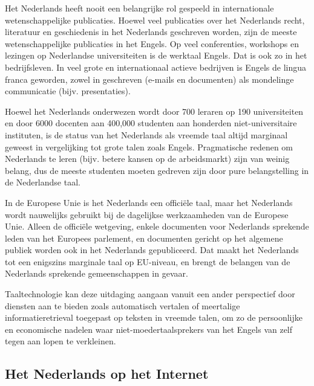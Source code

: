 \documentclass[]{../../metanetpaper}
\begin{document}
\begin{multicols}{2}
    Het Nederlands heeft nooit een belangrijke rol gespeeld in internationale wetenschappelijke publicaties. Hoewel veel publicaties over het Nederlands recht, literatuur en geschiedenis in het Nederlands geschreven worden, zijn de meeste wetenschappelijke publicaties in het Engels. Op veel conferenties, workshops en lezingen op Nederlandse universiteiten is de werktaal Engels. Dat is ook zo in het bedrijfsleven. In veel grote en internationaal actieve bedrijven is Engels de lingua franca geworden, zowel in geschreven (e-mails en documenten) als mondelinge communicatie (bijv. presentaties).


    Hoewel het Nederlands onderwezen wordt door 700 leraren op 190 universiteiten en door 6000 docenten aan 400,000 studenten aan honderden niet-universitaire instituten, is de status van het Nederlands als vreemde taal altijd marginaal geweest in vergelijking tot grote talen zoals Engels. Pragmatische redenen om Nederlands te leren (bijv. betere kansen op de arbeidsmarkt) zijn van weinig belang, dus de meeste studenten moeten gedreven zijn door pure belangstelling in de Nederlandse taal.

    In de Europese Unie is het Nederlands een offici{\"e}le taal, maar het Nederlands wordt nauwelijks gebruikt bij de dagelijkse werkzaamheden van de Europese Unie. Alleen de offici{\"e}le wetgeving, enkele documenten voor Nederlands sprekende leden van het Europees parlement, en documenten gericht op het algemene publiek worden ook in het Nederlands gepubliceerd. Dat maakt het Nederlands tot een enigszins marginale taal op EU-niveau, en brengt de belangen van de Nederlands sprekende gemeenschappen in gevaar.

    Taaltechnologie kan deze uitdaging aangaan vanuit een ander perspectief door diensten aan te bieden zoals automatisch vertalen of meertalige informatieretrieval toegepast op teksten in vreemde talen, om zo de persoonlijke en economische nadelen waar niet-moedertaalsprekers van het Engels van zelf tegen aan lopen te verkleinen.

\subsection{Het Nederlands op het Internet}


\end{multicols}
\end{document}
